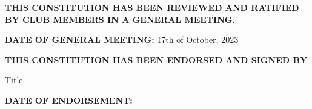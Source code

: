 \textbf{THIS CONSTITUTION HAS BEEN REVIEWED AND RATIFIED BY CLUB MEMBERS IN A GENERAL MEETING.}

\vspace{0.5cm}
\textbf{DATE OF GENERAL MEETING:} 17th of October, 2023

\vspace{0.5cm}
\textbf{THIS CONSTITUTION HAS BEEN ENDORSED AND SIGNED BY}

\signature{Name}{Title}

\vspace{0.5cm}
\textbf{DATE OF ENDORSEMENT:}
